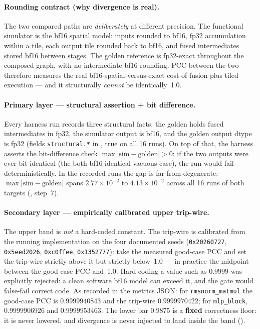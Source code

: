 \paragraph{Rounding contract (why divergence is real).}
The two compared paths are \emph{deliberately} at different precision. The
functional simulator is the bf16 spatial model: inputs rounded to bf16, fp32
accumulation within a tile, each output tile rounded back to bf16, and fused
intermediates stored bf16 between stages. The golden reference is fp32-exact
throughout the composed graph, with no intermediate bf16 rounding. PCC between the
two therefore measures the real bf16-spatial-versus-exact cost of fusion plus tiled
execution --- and it structurally \emph{cannot} be identically~1.0.

\paragraph{Primary layer --- structural assertion + bit difference.}
Every harness run records three structural facts: the golden holds fused
intermediates in fp32, the simulator output is bf16, and the golden output dtype is
fp32 (fields \texttt{structural.*} in
, true on all 16 runs). On top of that,
the harness asserts the bit-difference check
$\max|\text{sim}-\text{golden}| > 0$: if the two outputs were ever bit-identical
(the both-bf16-identical vacuous case), the run would fail deterministically. In
the recorded runs the gap is far from degenerate:
$\max|\text{sim}-\text{golden}|$ spans $2.77\times10^{-2}$ to
$4.13\times10^{-2}$ across all 16 runs of both targets
(, step~7).

\paragraph{Secondary layer --- empirically calibrated upper trip-wire.}
The upper band is \emph{not} a hard-coded constant. The trip-wire is calibrated
from the running implementation on the four documented seeds
(\texttt{0x20260727}, \texttt{0x5eed2026}, \texttt{0xc0ffee}, \texttt{0x1352777}):
take the measured good-case PCC and set the trip-wire strictly above it but
strictly below~1.0 --- in practice the midpoint between the good-case PCC
and~1.0. Hard-coding a value such as $0.9999$ was explicitly rejected: a clean
software bf16 model can exceed it, and the gate would false-fail correct code. As
recorded in the metrics JSON: for \texttt{rmsnorm\_matmul} the good-case PCC is
$0.9999940843$ and the trip-wire $0.9999970422$; for \texttt{mlp\_block},
$0.9999906926$ and $0.9999953463$. The lower bar $0.9875$ is a \textbf{fixed}
correctness floor: it is never lowered, and divergence is never injected to land
inside the band ().

